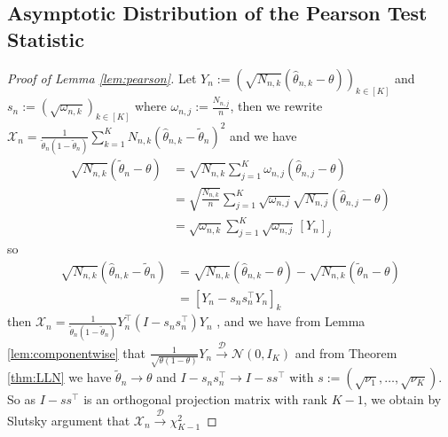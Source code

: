 \subsection{Asymptotic Distribution of the Pearson Test Statistic}
\begin{proof}[Proof of Lemma \ref{lem:pearson}]
	Let \(Y_n := \left( \sqrt{N_{n,k}}(\hat{\theta}_{n,k} - \theta)\right)_{k \in [K]}\) and \(s_n:=\left(\sqrt{\omega_{n,k}}\right)_{k \in [K]}\) where \(\omega_{n,j}:=\frac{N_{n,j}}{n}\), then we rewrite \(\mathcal{X}_n = \frac{1}{\tilde{\theta}_n (1 - \tilde{\theta}_n)} 
	\sum_{k=1}^K N_{n,k} (\hat{\theta}_{n,k} - \tilde{\theta}_n)^2\)
	and we have
	\begin{align*}
		\sqrt{N_{n,k}} (\tilde{\theta}_n - \theta)
		&= \sqrt{N_{n,k}} \sum_{j=1}^K \omega_{n,j} (\hat{\theta}_{n,j} - \theta)\\
		&= \sqrt{\frac{N_{n,k}}{n}} \sum_{j=1}^K \sqrt{\omega_{n,j}}\sqrt{N_{n,j}} (\hat{\theta}_{n,j} - \theta)\\
		&= \sqrt{\omega_{n,k}} \sum_{j=1}^K \sqrt{\omega_{n,j}} \, [Y_n]_j
	\end{align*}
	so 
	\begin{align*}
		\sqrt{N_{n,k}} (\hat{\theta}_{n,k} - \tilde{\theta}_n) &= \sqrt{N_{n,k}} (\hat{\theta}_{n,k} - \theta) 
		- \sqrt{N_{n,k}} (\tilde{\theta}_n - \theta)\\
		&= [Y_n - s_n s_n^\top Y_n]_k
	\end{align*}
	then \(\mathcal{X}_n = \frac{1}{\tilde{\theta}_n (1 - \tilde{\theta}_n)} 
	Y_n^\top (I - s_n s_n^\top) Y_n\)
	, and we have from Lemma \ref{lem:componentwise} that \(\frac{1}{\sqrt{\theta(1-\theta)}} Y_n \xrightarrow{\mathcal{D}} \mathcal{N}(0, I_K)\) and from Theorem \ref{thm:LLN} we have \(\tilde{\theta}_n \to \theta\) and \(I - s_n s_n^\top \to I - s s^\top
	\) with \(s := (\sqrt{\nu_1}, \dots, \sqrt{\nu_K})\). So as $I - s s^\top$ is an orthogonal projection matrix with rank $K-1$, we obtain by Slutsky argument that \(\mathcal{X}_n \xrightarrow{\mathcal{D}} \chi^2_{K-1}\)
\end{proof}



